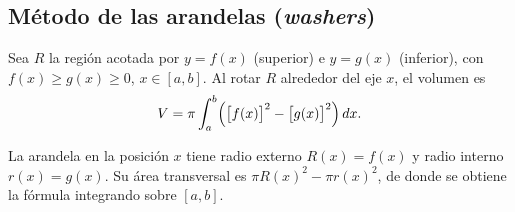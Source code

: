 \subsection{Método de las arandelas (\emph{washers})}

\begin{theorem}
Sea $R$ la región acotada por $y=f(x)$ (superior) e $y=g(x)$ (inferior),
con $f(x)\geq g(x)\geq 0$, $x\in[a,b]$. Al rotar $R$ alrededor del eje $x$,
el volumen es
\[
  V = \pi\int_a^b\Bigl(\bigl[f(x)\bigr]^2-\bigl[g(x)\bigr]^2\Bigr)\,dx.
\]
\end{theorem}

\begin{rem}
La arandela en la posición $x$ tiene radio externo $R(x)=f(x)$ y radio
interno $r(x)=g(x)$. Su área transversal es
$\pi R(x)^2-\pi r(x)^2$, de donde se obtiene la fórmula integrando sobre
$[a,b]$.
\end{rem}


